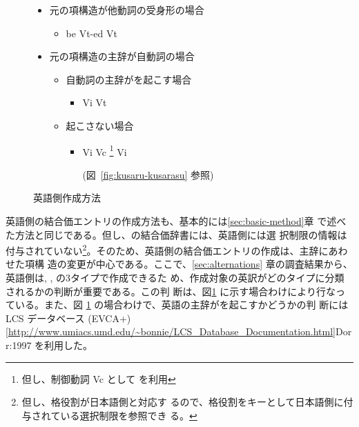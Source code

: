 \documentclass[japanese]{jnlp}
\newcommand{\eng}[1]{}
\newcommand{\coml}[1]{}
\newcommand{\comll}[1]{}
\newcommand{\comrr}[1]{}
\newcommand{\iz}[1]{}
\newcommand{\abs}{}
\newcommand{\sbj}{}
\newcommand{\obj}{}
\newcommand{\ix}{}
\newcommand{\typeSO}{}
\newcommand{\border}{}
\newcommand{\soalt}{}
\newcommand{\citep}{}
\newcommand{\altje}{}
\newcommand{\rto}{}
\begin{document}
{\begin{figure}[hb]
\begin{minipage}[t]{1.0\textwidth}
\begin{itemize}
  \item 元の項構造が他動詞の受身形の場合
    \begin{itemize}
    \item \sbj be Vt-ed \rto 
    \abs Vt \obj  \iz{[passive]} 
    \comll{(\eng{\sbj be defeated by \ix} }\\
    \comrr{\rto \eng{\abs (= \ix) defeat \obj)}} 
    \end{itemize}

  \item 元の項構造の主辞が自動詞の場合
  \begin{itemize}
  \item  自動詞の主辞が\soalt を起こす場合
    \begin{itemize}
    \item \sbj Vi 
      \rto \abs Vt \obj \iz{[\typeSO]}
       \coml{\eng{\sbj spoil \rto \abs spoil \obj}}
     \end{itemize} 

    \item 起こさない場合
    \begin{itemize}
    \item \sbj Vi  
      \rto \abs Vc \footnote{但し、制御動詞 Vc として\eng{make} を利用}
      \obj Vi  \iz{[synthetic]}
      \coml{\eng{\sbj rot \rto \abs make \obj rot}} 
      (図~\ref{fig:kusaru-kusarasu} 参照)
      
    \end{itemize}
  \end{itemize} 
  \end{itemize} 

\end{minipage}
\border
\caption{英語側作成方法}
\label{fig:mk-eng}
\end{figure}
}



英語側の結合価エントリの作成方法も、基本的には\ref{sec:basic-method}章
で述べた方法と同じである。但し、\altje の結合価辞書には、英語側には選
択制限の情報は付与されていない\footnote{但し、格役割が日本語側と対応す
  るので、格役割をキーとして日本語側に付与されている選択制限を参照でき
  る。}。そのため、英語側の結合価エントリの作成は、主辞にあわせた項構
造の変更が中心である。ここで、\ref{sec:alternations} 章の調査結果から、
英語側は\typeSO{}, \iz{passive}, \iz{synthetic}の3タイプで作成できるた
め、作成対象の英訳がどのタイプに分類されるかの判断が重要である。この判
断は、図\ref{fig:mk-eng} に示す場合わけにより行なっている。また、図
\ref{fig:mk-eng} の場合わけで、英語の主辞が\soalt を起こすかどうかの判
断にはLCS  データベース (EVCA+)
\citep[\url{http://www.umiacs.umd.edu/~bonnie/LCS_Database_Documentation.html}]{Dorr:1997}
を利用した。
\end{document}
